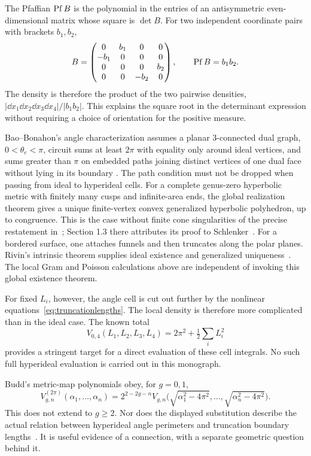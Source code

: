 The Pfaffian $\operatorname{Pf} B$ is the polynomial in the entries of an
antisymmetric even-dimensional matrix whose square is $\det B$.
For two independent coordinate pairs with brackets $b_1,b_2$,
\[
 B=\begin{pmatrix}0&b_1&0&0\\-b_1&0&0&0\\
 0&0&0&b_2\\0&0&-b_2&0\end{pmatrix},\qquad
 \operatorname{Pf} B=b_1b_2.
\]
The density is therefore the product of the two pairwise densities,
$|\dd x_1\dd x_2\dd x_3\dd x_4|/|b_1b_2|$.
This explains the square root in the determinant expression without
requiring a choice of orientation for the positive measure.

Bao--Bonahon's angle characterization assumes a planar $3$-connected dual
graph, $0<\theta_e<\pi$, circuit sums at least $2\pi$ with equality
only around ideal vertices, and sums greater than $\pi$ on embedded paths
joining distinct vertices of one dual face without lying in its boundary
\cite[Theorems 1--2]{BaoBonahon}. The path condition must not be dropped
when passing from ideal to hyperideal cells.
For a complete genus-zero hyperbolic metric with finitely many cusps and
infinite-area ends, the global realization theorem gives a unique
finite-vertex convex generalized hyperbolic polyhedron, up to congruence.
This is the case without finite cone singularities of the precise
restatement in~\cite[Theorem 1.1]{FillastreMetrics}; Section 1.3 there
attributes its proof to Schlenker~\cite{Schlenker}. For a bordered surface,
one attaches funnels and then truncates along the polar planes.
Rivin's intrinsic theorem supplies
ideal existence and generalized uniqueness~\cite[Theorems 1.1--1.3]{RivinIntrinsic}.
The local Gram and Poisson calculations above are independent of invoking
this global existence theorem.

For fixed $L_i$, however, the angle cell is cut out further by the nonlinear
equations~\eqref{eq:truncationlengths}. The local density is therefore more
complicated than in the ideal case. The known total
\[
 V_{0,4}(L_1,L_2,L_3,L_4)=2\pi^2+\tfrac12\sum_iL_i^2
\]
provides a stringent target for a direct evaluation of these cell integrals.
No such full hyperideal evaluation is carried out in this monograph.

Budd's metric-map polynomials obey, for $g=0,1$,
\begin{equation}
 V_{g,n}^{(2\pi)}(\alpha_1,\ldots,\alpha_n)
 =2^{2-2g-n}V_{g,n}\bigl(\sqrt{\alpha_1^2-4\pi^2},\ldots,
                         \sqrt{\alpha_n^2-4\pi^2}\bigr).
 \label{eq:buddidentity}
\end{equation}
This does not extend to $g\ge2$. Nor does the displayed substitution describe
the actual relation between hyperideal angle perimeters and truncation
boundary lengths~\cite[Corollary 2 and Section 1.3]{Budd}. It is useful
evidence of a connection, with a separate geometric question behind it.

